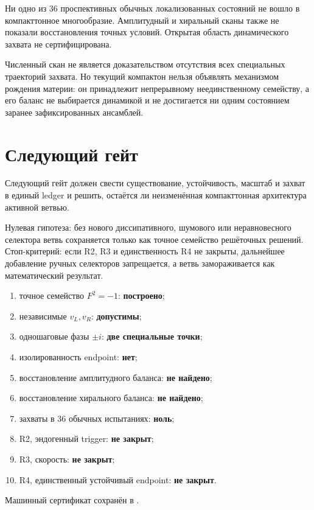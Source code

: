 \begin{proposition}
Ни одно из $36$ проспективных обычных локализованных состояний не вошло в
компакттонное многообразие. Амплитудный и хиральный сканы также не показали
восстановления точных условий. Открытая область динамического захвата не
сертифицирована.
\end{proposition}

\begin{nogocriterion}
Численный скан не является доказательством отсутствия всех специальных
траекторий захвата. Но текущий компактон нельзя объявлять механизмом
рождения материи: он принадлежит непрерывному неединственному семейству,
а его баланс не выбирается динамикой и не достигается ни одним состоянием
заранее зафиксированных ансамблей.
\end{nogocriterion}

\section{Следующий гейт}

Следующий гейт
должен свести существование, устойчивость, масштаб и захват в единый
ledger и решить, остаётся ли неизменённая компакттонная архитектура
активной ветвью.

Нулевая гипотеза: без нового диссипативного, шумового или
неравновесного селектора ветвь сохраняется только как точное семейство
решёточных решений. Стоп-критерий: если R2, R3 и единственность R4 не
закрыты, дальнейшее добавление ручных селекторов запрещается, а ветвь
замораживается как математический результат.

\begin{protocol}
\begin{enumerate}
 \item точное семейство $F^2=-1$: \textbf{построено};
 \item независимые $v_L,v_R$: \textbf{допустимы};
 \item одношаговые фазы $\pm i$: \textbf{две специальные точки};
 \item изолированность endpoint: \textbf{нет};
 \item восстановление амплитудного баланса: \textbf{не найдено};
 \item восстановление хирального баланса: \textbf{не найдено};
 \item захваты в $36$ обычных испытаниях: \textbf{ноль};
 \item R2, эндогенный trigger: \textbf{не закрыт};
 \item R3, скорость: \textbf{не закрыт};
 \item R4, единственный устойчивый endpoint: \textbf{не закрыт}.
\end{enumerate}
\end{protocol}

Машинный сертификат сохранён в
.